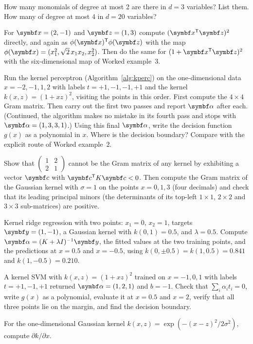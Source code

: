 \documentclass[11pt]{article}
\newcommand{\z}{\vect{z}}
\newcommand{\y}{\vect{y}}
\newcommand{\valpha}{\vect{\alpha}}
\begin{document}
\begin{questions}
\begin{calculations}
\item How many monomials of degree at most 2 are there in $d = 3$ variables? List them. How many of degree at most 4 in
  $d = 20$ variables?
\item For $\x = (2, -1)$ and $\z = (1, 3)$ compute $(\x\T\z)^2$ directly, and again as $\phi(\x)\T\phi(\z)$ with the
  map $\phi(\x) = (x_1^2, \sqrt2\,x_1x_2, x_2^2)$. Then do the same for $(1 + \x\T\z)^2$ with the six-dimensional map of
  Worked example~3.
\item Run the kernel perceptron (Algorithm~\ref{alg:kperc}) on the one-dimensional data $x = -2, -1, 1, 2$ with labels
  $t = +1, -1, -1, +1$ and the kernel $k(x, z) = (1 + xz)^2$, visiting the points in this order. First compute the
  $4 \times 4$ Gram matrix. Then carry out the first two passes and report $\valpha$ after each. (Continued, the
  algorithm makes no mistake in its fourth pass and stops with $\valpha = (1, 3, 3, 1)$.) Using this final $\valpha$,
  write the decision function $g(x)$ as a polynomial in $x$. Where is the decision boundary? Compare with the explicit
  route of Worked example~2.
\item Show that $\begin{pmatrix} 1 & 2 \\ 2 & 1 \end{pmatrix}$ cannot be the Gram matrix of any kernel by exhibiting a
  vector $\vect{c}$ with $\vect{c}\T K\vect{c} < 0$. Then compute the Gram matrix of the Gaussian kernel with $\sigma = 1$
  on the points $x = 0, 1, 3$ (four decimals) and check that its leading principal minors (the determinants of its
  top-left $1 \times 1$, $2 \times 2$ and $3 \times 3$ sub-matrices) are positive.
\item Kernel ridge regression with two points: $x_1 = 0$, $x_2 = 1$, targets $\y = (1, -1)$, a Gaussian kernel with
  $k(0, 1) = 0.5$, and $\lambda = 0.5$. Compute $\valpha = (K + \lambda I)^{-1}\y$, the fitted values at the two training
  points, and the predictions at $x = 0.5$ and $x = -0.5$, using $k(0, \pm 0.5) = k(1, 0.5) = 0.841$ and
  $k(1, -0.5) = 0.210$.
\item A kernel SVM with $k(x, z) = (1 + xz)^2$ trained on $x = -1, 0, 1$ with labels $t = +1, -1, +1$ returned $\valpha =
  (1, 2, 1)$ and $b = -1$. Check that $\sum_i\alpha_it_i = 0$, write $g(x)$ as a polynomial, evaluate it at $x = 0.5$ and
  $x = 2$, verify that all three points lie on the margin, and find the decision boundary.
\item For the one-dimensional Gaussian kernel $k(x, z) = \exp(-(x - z)^2/2\sigma^2)$, compute $\partial k/\partial x$.

\end{calculations}
\end{questions}
\end{document}
